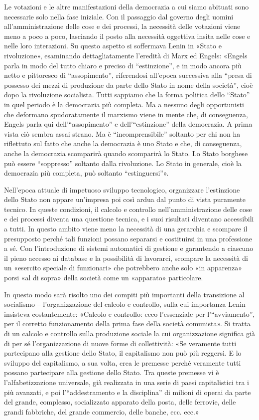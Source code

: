 \documentclass[../main]{subfiles}
\begin{document}
Le votazioni e le altre manifestazioni della democrazia a cui siamo abituati sono necessarie solo nella fase iniziale. Con il passaggio dal governo degli uomini all'amministrazione delle cose e dei processi, la necessità delle votazioni viene meno a poco a poco, lasciando il posto alla necessità oggettiva insita nelle cose e nelle loro interazioni. Su questo aspetto si soffermava Lenin in «Stato e rivoluzione», esaminando dettagliatamente l'eredità di Marx ed Engels: «Engels parla in modo del tutto chiaro e preciso di “estinzione”, e in modo ancora più netto e pittoresco di “assopimento”, riferendosi all'epoca successiva alla “presa di possesso dei mezzi di produzione da parte dello Stato in nome della società”, cioè dopo la rivoluzione socialista. Tutti sappiamo che la forma politica dello “Stato” in quel periodo è la democrazia più completa. Ma a nessuno degli opportunisti che deformano spudoratamente il marxismo viene in mente che, di conseguenza, Engels parla qui dell'“assopimento” e dell'“estinzione” della democrazia. A prima vista ciò sembra assai strano. Ma è “incomprensibile” soltanto per chi non ha riflettuto sul fatto che anche la democrazia è uno Stato e che, di conseguenza, anche la democrazia scomparirà quando scomparirà lo Stato. Lo Stato borghese può essere “soppresso” soltanto dalla rivoluzione. Lo Stato in generale, cioè la democrazia più completa, può soltanto “estinguersi”».

Nell'epoca attuale di impetuoso sviluppo tecnologico, organizzare l'estinzione dello Stato non appare un'impresa poi così ardua dal punto di vista puramente tecnico. In queste condizioni, il calcolo e controllo nell'amministrazione delle cose e dei processi diventa una questione tecnica, e i suoi risultati diventano accessibili a tutti. In questo ambito viene meno la necessità di una gerarchia e scompare il presupposto perché tali funzioni possano separarsi e costituirsi in una professione a sé. Con l'introduzione di sistemi automatici di gestione e garantendo a ciascuno il pieno accesso ai database e la possibilità di lavorarci, scompare la necessità di un «esercito speciale di funzionari» che potrebbero anche solo «in apparenza» porsi «al di sopra» della società come un «apparato» particolare.

In questo modo sarà risolto uno dei compiti più importanti della transizione al socialismo – l'organizzazione del calcolo e controllo, sulla cui importanza Lenin insisteva costantemente: «Calcolo e controllo: ecco l'essenziale per l'“avviamento”, per il corretto funzionamento della prima fase della società comunista». Si tratta di un calcolo e controllo sulla produzione sociale la cui organizzazione significa già di per sé l'organizzazione di nuove forme di collettività: «Se veramente tutti partecipano alla gestione dello Stato, il capitalismo non può più reggersi. E lo sviluppo del capitalismo, a sua volta, crea le premesse perché veramente tutti possano partecipare alla gestione dello Stato. Tra queste premesse vi è l'alfabetizzazione universale, già realizzata in una serie di paesi capitalistici tra i più avanzati, e poi l'“addestramento e la disciplina” di milioni di operai da parte del grande, complesso, socializzato apparato della posta, delle ferrovie, delle grandi fabbriche, del grande commercio, delle banche, ecc. ecc.»
\end{document}
